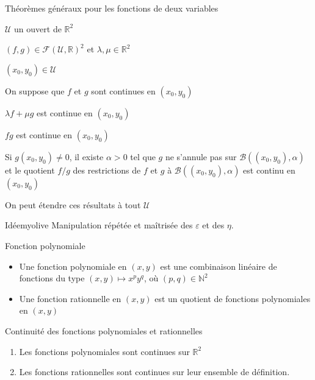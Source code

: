     \begin{prop}{Théorèmes généraux pour les fonctions de deux variables}{}
        \begin{soient}
            \item $\mathcal{U}$ un ouvert de $\mathbb{R}^2$
            \item $(f,g) \in \mathcal{F}(\mathcal{U},\mathbb{R})^2$ et $\lambda,\mu \in \mathbb{R}^2$
            \item $(x_0,y_0) \in \mathcal{U}$
        \end{soient}
        On suppose que $f$ et $g$ sont continues en $(x_0,y_0)$

        \begin{alors}
            \item $\lambda f + \mu g$ est continue en $(x_0,y_0)$
            \item $fg$ est continue en $(x_0,y_0)$
            \item Si $g(x_0,y_0) \neq 0$, il existe $\alpha >0$  tel que $g$ ne s’annule pas sur $\mathcal{B}\left((x_0,y_0), \alpha\right)$ et le quotient $ f / g$ des restrictions de $f$ et $g$ à $\mathcal{B}\left((x_0,y_0), \alpha\right)$ est continu en $(x_0,y_0)$
        \end{alors}
        On peut étendre ces résultats à tout $\mathcal{U}$
    \end{prop}

    \begin{demo}{Idée}{myolive}
        Manipulation répétée et maîtrisée des $\varepsilon$ et des $\eta$.
    \end{demo}

    \begin{defi}{Fonction polynomiale}{}
        \begin{itemize}
            \item Une fonction polynomiale en $(x,y)$ est une combinaison linéaire de fonctions du type $(x,y) \longmapsto x^p y^q$, où $(p,q) \in \mathbb{N}^2$
            \item Une fonction rationnelle en $(x,y)$ est un quotient de fonctions polynomiales en $(x,y)$
        \end{itemize}
    \end{defi}

    \begin{coro}{Continuité des fonctions polynomiales et rationnelles}{}
        \begin{enumerate}
            \item Les fonctions polynomiales sont continues sur $\mathbb{R}^2$
            \item Les fonctions rationnelles sont continues sur leur ensemble de définition.
        \end{enumerate}
    \end{coro}

